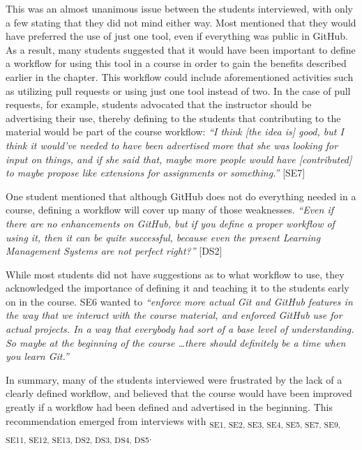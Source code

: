 This was an almost unanimous issue between the students interviewed, with only a few stating that they did not mind either way. Most mentioned that they would have preferred the use of just one tool, even if everything was public in GitHub. As a result, many students suggested that it would have been important to define a workflow for using this tool in a course in order to gain the benefits described earlier in the chapter. This workflow could include aforementioned activities such as utilizing pull requests or using just one tool instead of two. In the case of pull requests, for example, students advocated that the instructor should be advertising their use, thereby defining to the students that contributing to the material would be part of the course workflow: \textit{``I think [the idea is] good, but I think it would've needed to have been advertised more that she was looking for input on things, and if she said that, maybe more people would have [contributed] to maybe propose like extensions for assignments or something.''} [SE7]

One student mentioned that although GitHub does not do everything needed in a course, defining a workflow will cover up many of those weaknesses. \textit{``Even if there are no enhancements on GitHub, but if you define a proper workflow of using it, then it can be quite successful, because even the present Learning Management Systems are not perfect right?''} [DS2]

While most students did not have suggestions as to what workflow to use, they acknowledged the importance of defining it and teaching it to the students early on in the course. SE6 wanted to \textit{``enforce more actual Git and GitHub features in the way that we interact with the course material, and enforced GitHub use for actual projects. In a way that everybody had sort of a base level of understanding. So maybe at the beginning of the course \ldots there should definitely be a time when you learn Git.''}

In summary, many of the students interviewed were frustrated by the lack of a clearly defined workflow, and believed that the course would have been improved greatly if a workflow had been defined and advertised in the beginning. This recommendation emerged from interviews with \textsubscript{SE1, SE2, SE3, SE4, SE5, SE7, SE9, SE11, SE12, SE13, DS2, DS3, DS4, DS5}.


